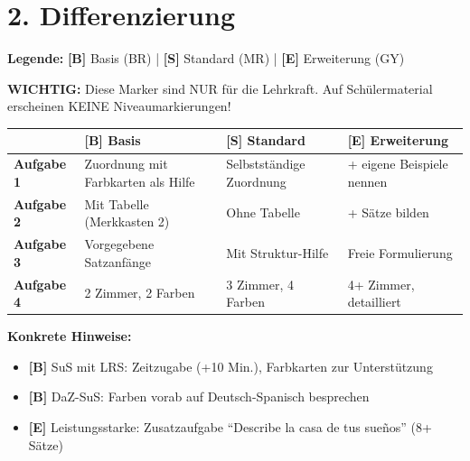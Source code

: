 \documentclass[11pt, a4paper]{article}
\newcommand{\B}{\textcolor{basis}{\textbf{[B]}}}
\newcommand{\Std}{\textcolor{standard}{\textbf{[S]}}}
\newcommand{\E}{\textcolor{erweiterung}{\textbf{[E]}}}
\begin{document}

\section*{2. Differenzierung}

\begin{differenzierung}
\textbf{Legende:} \B{} Basis (BR) | \Std{} Standard (MR) | \E{} Erweiterung (GY)

\vspace{0.5em}

\textbf{WICHTIG:} Diese Marker sind NUR für die Lehrkraft. Auf Schülermaterial erscheinen KEINE Niveaumarkierungen!
\end{differenzierung}

\vspace{1em}

\begin{tabularx}{\textwidth}{|l|X|X|X|}
\hline
& \B{} \textbf{Basis} & \Std{} \textbf{Standard} & \E{} \textbf{Erweiterung} \\
\hline
\textbf{Aufgabe 1} & Zuordnung mit Farbkarten als Hilfe & Selbstständige Zuordnung & + eigene Beispiele nennen \\
\hline
\textbf{Aufgabe 2} & Mit Tabelle (Merkkasten 2) & Ohne Tabelle & + Sätze bilden \\
\hline
\textbf{Aufgabe 3} & Vorgegebene Satzanfänge & Mit Struktur-Hilfe & Freie Formulierung \\
\hline
\textbf{Aufgabe 4} & 2 Zimmer, 2 Farben & 3 Zimmer, 4 Farben & 4+ Zimmer, detailliert \\
\hline
\end{tabularx}

\vspace{1em}

\textbf{Konkrete Hinweise:}
\begin{itemize}
    \item \B{} SuS mit LRS: Zeitzugabe (+10 Min.), Farbkarten zur Unterstützung
    \item \B{} DaZ-SuS: Farben vorab auf Deutsch-Spanisch besprechen
    \item \E{} Leistungsstarke: Zusatzaufgabe ``Describe la casa de tus sueños'' (8+ Sätze)
\end{itemize}

\end{document}
